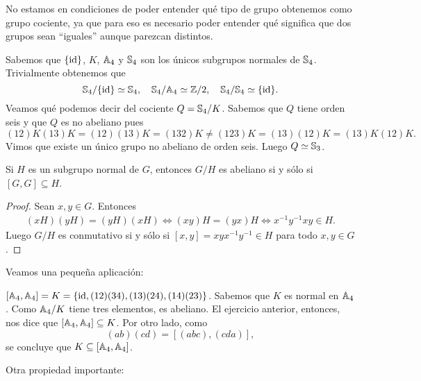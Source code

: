No estamos en condiciones de poder entender qué tipo de grupo obtenemos
como grupo cociente, ya que para eso es necesario poder entender qué significa 
que dos grupos sean ``iguales'' aunque parezcan distintos. 
 
\begin{example}
	Sabemos que $\{\operatorname{id}\}$, $K$, $\mathbb{A}_4$ y $\mathbb{S}_4$ son los únicos subgrupos normales de $\mathbb{S}_4$. Trivialmente 
	obtenemos que
	\[
	\mathbb{S}_4/\{\operatorname{id}\}\simeq\mathbb{S}_4,\quad
	\mathbb{S}_4/\mathbb{A}_4\simeq\mathbb{Z}/2,\quad
	\mathbb{S}_4/\mathbb{S}_4\simeq\{\operatorname{id}\}.
	\]
	Veamos qué podemos decir del cociente $Q=\mathbb{S}_4/K$. Sabemos que $Q$ tiene orden seis y que $Q$ es no abeliano pues
	\[
	(12)K(13)K=(12)(13)K=(132)K\ne (123)K=(13)(12)K=(13)K(12)K.
	\]
	Vimos que existe un único grupo no abeliano de orden seis. Luego $Q\simeq\mathbb{S}_3$. 
\end{example}


\begin{proposition}
Si $H$ es un subgrupo normal de $G$, entonces $G/H$ es abeliano si y sólo si $[G,G]\subseteq H$. 
\end{proposition}

\begin{proof}
Sean $x,y\in G$. Entonces 
\begin{align*}
    (xH)(yH)=(yH)(xH) \Longleftrightarrow (xy)H=(yx)H \Longleftrightarrow x^{-1}y^{-1}xy\in H.
\end{align*}
Luego $G/H$ es conmutativo si y sólo si $[x,y]=xyx^{-1}y^{-1}\in H$ para todo $x,y\in G$. 
\end{proof}

Veamos una pequeña aplicación:

\begin{example}
$[\mathbb{A}_4,\mathbb{A}_4]=K=\{\operatorname{id},(12)(34),(13)(24),(14)(23)\}$. 
Sabemos que $K$ es normal en $\mathbb{A}_4$. Como $\mathbb{A}_4/K$ tiene tres elementos, es abeliano. El ejercicio anterior, entonces, 
nos dice que $[\mathbb{A}_4,\mathbb{A}_4]\subseteq K$. Por otro lado, como 
\[
(ab)(cd)=[(abc),(cda)],
\]   	
se concluye que $K\subseteq[\mathbb{A}_4,\mathbb{A}_4]$. 
\end{example}

Otra propiedad importante:

